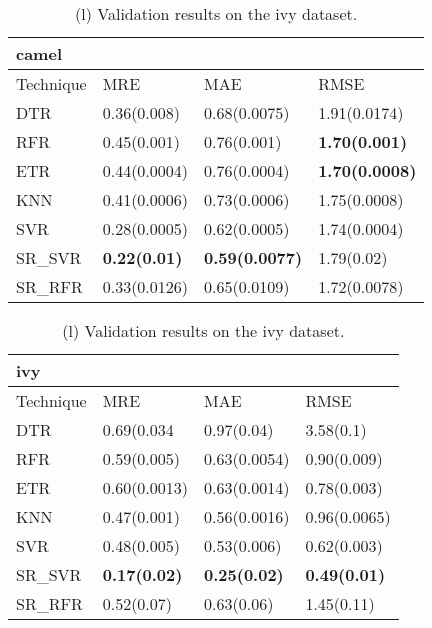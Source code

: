 \documentclass[]{article}
\begin{document}
	\begin{table}[h]
		\captionsetup[subtable]{labelformat=empty}
		\begin{adjustwidth}{-3.4cm}{}
			\begin{subtable}{9.5cm}
				\centering
				\caption{(k) Validation results on the camel dataset.}
				\label{tab:xalan-wv}
				\begin{tabular}{llll}
					\hline
							camel &              &              &              \\ \hline
					Technique & MRE          & MAE          & RMSE         \\ \hline
					DTR       & 0.36(0.008) & 0.68(0.0075) & 1.91(0.0174) \\
					RFR       & 0.45(0.001) & 0.76(0.001) & \bfseries 1.70(0.001) \\
					ETR       & 0.44(0.0004) & 0.76(0.0004) & \bfseries 1.70(0.0008) \\
					KNN       & 0.41(0.0006) & 0.73(0.0006) & 1.75(0.0008) \\
					SVR       & 0.28(0.0005) & 0.62(0.0005) & 1.74(0.0004) \\
					SR\_SVR    & \bfseries 0.22(0.01) & \bfseries 0.59(0.0077) & 1.79(0.02) \\
					SR\_RFR    & 0.33(0.0126) & 0.65(0.0109) & 1.72(0.0078) \\ \hline
				\end{tabular}
			\end{subtable}
			\begin{subtable}{9.5cm}
				\centering
				\caption{(l) Validation results on the ivy dataset.}
				\label{tab:xerces-wv}
				\begin{tabular}{llll}
					\hline
							ivy   &              &              &              \\ \hline
					Technique & MRE          & MAE          & RMSE         \\ \hline
					DTR       & 0.69(0.034 & 0.97(0.04) & 3.58(0.1) \\
					RFR       & 0.59(0.005) & 0.63(0.0054) & 0.90(0.009) \\
					ETR       & 0.60(0.0013) & 0.63(0.0014) & 0.78(0.003) \\
					KNN       & 0.47(0.001) & 0.56(0.0016) & 0.96(0.0065) \\
					SVR       & 0.48(0.005) & 0.53(0.006) & 0.62(0.003) \\
					SR\_SVR    & \bfseries 0.17(0.02) & \bfseries 0.25(0.02) & \bfseries 0.49(0.01) \\
					SR\_RFR    & 0.52(0.07) & 0.63(0.06) & 1.45(0.11) \\ \hline
				\end{tabular}
			\end{subtable} 
		\end{adjustwidth}
	\end{table}
\end{document}
